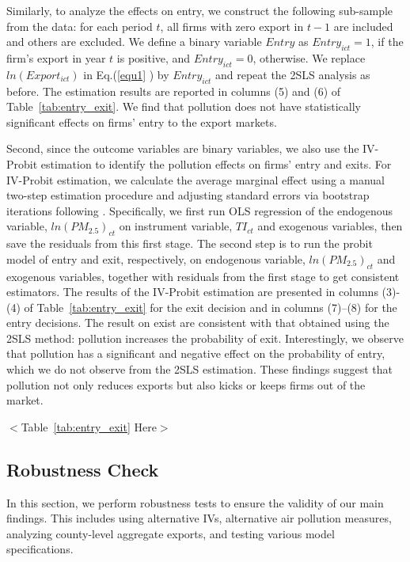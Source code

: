 \documentclass[12pt]{article}
\begin{document}
Similarly, to analyze the effects on entry, we construct the following
sub-sample from the data: for each period $t$, all firms with zero export in 
$t-1$ are included and others are excluded. We define a binary variable $%
Entry $ as $Entry_{ict}=1$, if the firm's export in year $t$ is positive, and $%
Entry_{ict}=0$, otherwise. We replace $ln(Export_{ict})$ in Eq.(\ref{equ1}%
) by $Entry_{ict}$ and repeat the 2SLS analysis as before. The estimation
results are reported in columns (5) and (6) of Table~\ref{tab:entry_exit}. We find that
pollution does not have statistically significant effects on firms' entry to
the export markets.

Second, since the outcome variables are binary variables, we also use the
IV-Probit estimation to identify the pollution effects on firms' entry and exits. For IV-Probit estimation, we calculate the 
average marginal effect using a manual two-step estimation procedure and adjusting standard errors via bootstrap iterations 
following \citep{wooldridge2010econometric}. Specifically, we
first run OLS regression of the endogenous variable, $ln(PM_{2.5})_{ct}$ on
instrument variable, $TI_{ct}$ and exogenous variables, then
save the residuals from this first stage. The second step is to run the probit
model of entry and exit, respectively, on endogenous variable, $ln(PM_{2.5})_{ct}$ and exogenous variables, together with residuals from the first stage to get consistent estimators. 
The results of the IV-Probit estimation are presented in columns (3)-(4) of Table~\ref{tab:entry_exit} for the exit decision and in 
columns (7)--(8) for the entry decisions. The result on exist are consistent with that obtained using the 2SLS method: pollution increases the probability of exit. Interestingly, we observe that pollution has a significant and negative effect on the probability of entry, which we do not observe from the 2SLS estimation. These findings suggest that pollution not only reduces exports but also kicks or keeps firms out of the market.

\begin{center}
  $<$Table~\ref{tab:entry_exit} Here$>$
\end{center}

\subsection{Robustness Check}
In this section, we perform robustness tests to ensure the validity of our main findings. This includes using alternative IVs, alternative air pollution measures, analyzing county-level aggregate exports, and testing various model specifications.
\end{document}
